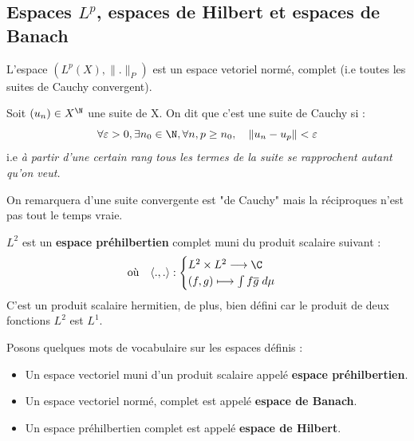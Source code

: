 \newpage 

\subsection{Espaces $L^p$, espaces de Hilbert et espaces de Banach}

\begin{theorem}
    L'espace $(L^p(X), \|.\|_P)$ est un espace vetoriel normé, complet
    (i.e toutes les suites de Cauchy convergent).
\end{theorem}

\begin{remark}
    Soit $(u_n) \in X^\N$ une suite de X. On dit que c'est une suite de Cauchy si :
        \[ \forall \varepsilon > 0, \exists n_0 \in \N, \forall n,p \geq n_0, \quad \| u_n - u_p\| < \varepsilon \] 
    i.e \emph{à partir d'une certain rang tous les termes de la suite se rapprochent autant qu'on veut.}
    
    On remarquera d'une suite convergente est "de Cauchy" mais la réciproques n'est pas tout le temps vraie. 
\end{remark}

\begin{theorem}[Structure de $L^2$]
    $L^2$ est un \textbf{espace préhilbertien} complet muni du produit scalaire suivant :
    \[ \text{où} \quad \langle .,. \rangle : 
        \begin{cases}
            L^2 \times L^2 \longrightarrow \C \\ 
            (f,g) \longmapsto \int f \overline{g} \; d \mu 
        \end{cases}
    \]
    C'est un produit scalaire hermitien, de plus, bien défini car le produit de deux fonctions $L^2$ est $L^1$. 
\end{theorem}

\begin{remark} Posons quelques mots de vocabulaire sur les espaces définis :
    \begin{itemize}
        \item Un espace vectoriel muni d'un produit scalaire appelé \textbf{espace préhilbertien}.
        \item Un espace vectoriel normé, complet est appelé \textbf{espace de Banach}. 
        \item Un espace préhilbertien complet est appelé \textbf{espace de Hilbert}.
    \end{itemize}
\end{remark}

